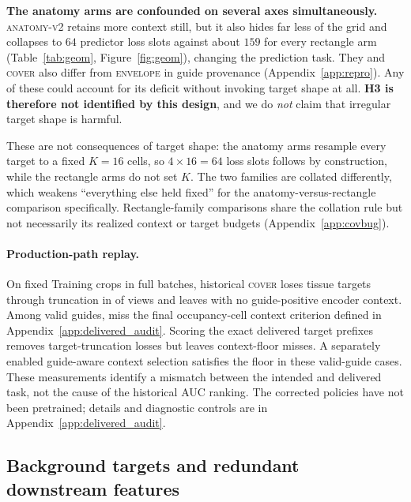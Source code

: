 \documentclass{article}
\begin{document}
\textbf{The anatomy arms are confounded on several axes simultaneously.}
\textsc{anatomy-v2} retains more context still, but it also hides far less of the
grid and collapses to
$64$ predictor loss slots against about $159$ for every rectangle arm
(Table~\ref{tab:geom}, Figure~\ref{fig:geom}), changing the prediction task. They and \textsc{cover}
also differ from \textsc{envelope} in guide provenance
(Appendix~\ref{app:repro}). Any of these could
account for its deficit without invoking target shape at all. \textbf{H3 is
therefore not identified by this design}, and we do \emph{not} claim that
irregular target shape is harmful.

These are not consequences of target shape: the anatomy arms resample
every target to a fixed $K{=}16$ cells, so $4\times16=64$ loss slots follows by
construction, while the rectangle arms do not set $K$. The two families are
collated differently, which weakens ``everything else held fixed'' for the
anatomy-versus-rectangle comparison specifically. Rectangle-family comparisons
share the collation rule but not necessarily its realized context or target
budgets (Appendix~\ref{app:covbug}).

\paragraph{Production-path replay.}
On fixed Training crops in full batches, historical \textsc{cover} loses
tissue targets through truncation in \DTTissueTruncation{} of \DTFullImages{}
views and leaves \DTZeroContext{} with no guide-positive encoder context.
Among \DTValidGuides{} valid guides, \DTLegacyFloorMiss{} miss the final
occupancy-cell context criterion defined in Appendix~\ref{app:delivered_audit}.
Scoring the exact delivered target prefixes removes
target-truncation losses but leaves \DTPrefixFloorMiss{} context-floor misses.
A separately enabled guide-aware context selection satisfies the floor in
these valid-guide cases. These measurements identify a mismatch between the
intended and delivered task, not the cause of the historical AUC ranking.
The corrected policies have not been pretrained; details and diagnostic
controls are in Appendix~\ref{app:delivered_audit}.

\subsection{Background targets and redundant downstream features}
\label{sec:results-bg}
\end{document}
